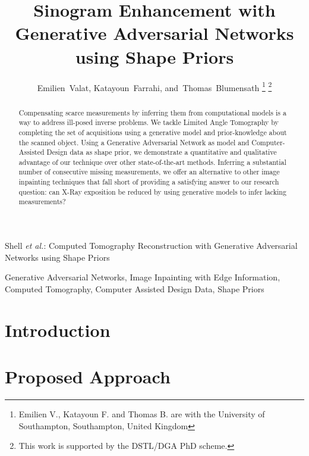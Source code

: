 \documentclass[journal]{IEEEtran}
\begin{document}
\title{Sinogram Enhancement with Generative Adversarial Networks using Shape Priors}

\author{Emilien~Valat,
        Katayoun~Farrahi,
        and~Thomas~Blumensath%
\thanks{Emilien V., Katayoun F. and Thomas B. are with the University of Southampton, Southampton, United Kingdom}
\thanks{This work is supported by the DSTL/DGA PhD scheme.}
}
%
{Shell \MakeLowercase{\textit{et al.}}: \xr Computed Tomography Reconstruction with Generative Adversarial Networks using Shape Priors}
\maketitle

\begin{abstract}
Compensating scarce measurements by inferring them from computational models is a way to address ill-posed inverse problems. We tackle Limited Angle Tomography by completing the set of acquisitions using a generative model and prior-knowledge about the scanned object.
Using a Generative Adversarial Network as model and Computer-Assisted Design data as shape prior, we demonstrate a quantitative and qualitative advantage of our technique over other state-of-the-art methods. Inferring a substantial number of consecutive missing measurements, we offer an alternative to other image inpainting techniques that fall short of providing a satisfying answer to our research question: can X-Ray exposition be reduced by using generative models to infer lacking measurements?  
\end{abstract}

\begin{IEEEkeywords}
Generative Adversarial Networks, Image Inpainting with Edge Information, \xr Computed Tomography, Computer Assisted Design Data, Shape Priors
\end{IEEEkeywords}

\IEEEpeerreviewmaketitle

 \section{Introduction}



\section{Proposed Approach}
\end{document}

